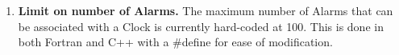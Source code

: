 
\begin{enumerate}

\item {\bf Limit on number of Alarms.}  The maximum number of Alarms that 
can be associated with a Clock is currently hard-coded at 100.  This is done
in both Fortran and C++ with a \#define for ease of modification.

\end{enumerate}
